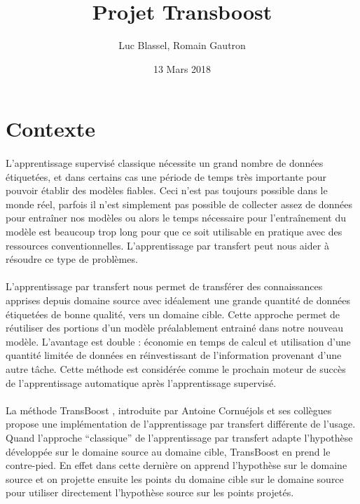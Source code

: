 \documentclass[11 pt]{article}
\title{Projet Transboost}
\author{Luc Blassel, Romain Gautron}
\date{13 Mars 2018}
\begin{document}
\maketitle

\tableofcontents
\newpage

\section{Contexte}
\paragraph{}L’apprentissage supervisé  classique nécessite un grand nombre de données étiquetées, et dans certains cas une période de temps très importante pour pouvoir établir des modèles fiables. Ceci n’est pas toujours possible dans le monde réel, parfois il n’est simplement pas possible de collecter assez de données pour entraîner nos modèles ou alors le temps nécessaire pour l'entraînement du modèle est beaucoup trop long pour que ce soit utilisable en pratique avec des ressources conventionnelles. L’apprentissage par transfert peut nous aider à résoudre ce type de problèmes.

\paragraph{}L’apprentissage par transfert nous permet de transférer des connaissances apprises depuis domaine source avec idéalement une grande quantité de données étiquetées de bonne qualité, vers un domaine cible. Cette approche permet de réutiliser des portions d’un modèle préalablement entrainé dans notre nouveau modèle. L'avantage est double : économie en temps de calcul et utilisation d'une quantité limitée de données en réinvestissant de l'information provenant d'une autre tâche. Cette méthode est considérée comme le prochain moteur de succès de l’apprentissage automatique après l’apprentissage supervisé.

\paragraph{}La méthode TransBoost \cite{transboost}, introduite par Antoine Cornuéjols et ses collègues propose une implémentation de l’apprentissage par transfert différente de l'usage. Quand l’approche “classique” de l’apprentissage par transfert adapte l'hypothèse développée sur le domaine source au domaine cible, TransBoost en prend le contre-pied. En effet dans cette dernière on apprend l'hypothèse sur le domaine source et on projette ensuite les points du domaine cible sur le domaine source pour utiliser directement l'hypothèse source sur les points projetés.
\end{document}
